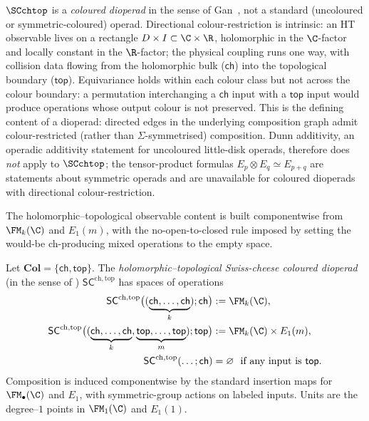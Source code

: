 $\SCchtop$ is a \emph{coloured dioperad} in the sense of
Gan~\cite{Gan03}, not a standard (uncoloured or symmetric-coloured)
operad. Directional colour-restriction is intrinsic: an HT
observable lives on a rectangle $D \times I \subset \C \times \R$,
holomorphic in the $\C$-factor and locally constant in the
$\R$-factor; the physical coupling runs one way, with collision data
flowing from the holomorphic bulk ($\mathsf{ch}$) into the
topological boundary ($\mathsf{top}$). Equivariance holds within
each colour class but not across the colour boundary: a permutation
interchanging a $\mathsf{ch}$ input with a $\mathsf{top}$ input
would produce operations whose output colour is not preserved. This
is the defining content of a dioperad: directed edges in the
underlying composition graph admit colour-restricted (rather than
$\Sigma$-symmetrised) composition. Dunn additivity, an operadic
additivity statement for uncoloured little-disk operads, therefore
does \emph{not} apply to $\SCchtop$; the tensor-product formulas
$E_p \otimes E_q \simeq E_{p+q}$ are statements about symmetric
operads and are unavailable for coloured dioperads with directional
colour-restriction.

The holomorphic--topological observable content is built componentwise
from $\FM_k(\C)$ and $E_1(m)$, with the no-open-to-closed rule
imposed by setting the would-be ch-producing mixed operations to the
empty space.

\begin{definition}
\label{def:SC}
Let $\mathbf{Col}=\{\mathsf{ch},\mathsf{top}\}$. The
\emph{holomorphic--topological Swiss-cheese coloured dioperad} (in the
sense of \cite{Gan03}) $\mathsf{SC}^{\mathrm{ch,top}}$ has spaces of
operations
\begin{align*}
\mathsf{SC}^{\mathrm{ch,top}}\bigl((\underbrace{\mathsf{ch},\dots,\mathsf{ch}}_{k});\mathsf{ch}\bigr) &:= \FM_k(\C),\\
\mathsf{SC}^{\mathrm{ch,top}}\bigl((\underbrace{\mathsf{ch},\dots,\mathsf{ch}}_{k},\underbrace{\mathsf{top},\dots,\mathsf{top}}_{m});\mathsf{top}\bigr) &:= \FM_k(\C)\times E_1(m),\\
\mathsf{SC}^{\mathrm{ch,top}}(\ldots;\mathsf{ch}) &= \varnothing \ \text{ if any input is $\mathsf{top}$}.
\end{align*}
Composition is induced componentwise by the standard insertion maps for $\FM_\bullet(\C)$ and $E_1$, with symmetric-group actions on labeled inputs. Units are the degree–$1$ points in $\FM_1(\C)$ and $E_1(1)$.
\end{definition}

